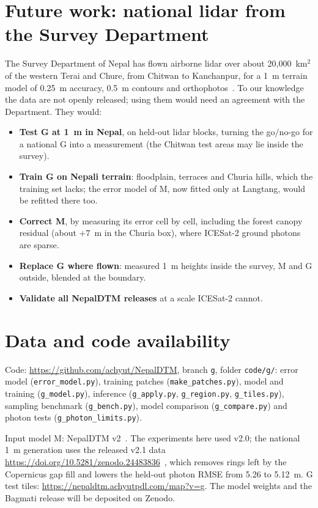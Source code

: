 \documentclass[11pt]{article}
\begin{document}
\section{Future work: national lidar from the Survey Department}
\label{sec:future}
The Survey Department of Nepal has flown airborne lidar over about 20{,}000~km$^2$ of the western Terai and Chure, from
Chitwan to Kanchanpur, for a 1~m terrain model of 0.25~m accuracy, 0.5~m contours and orthophotos~\citep{joshi2020lidar}.
To our knowledge the data are not openly released; using them would need an agreement with the Department. They would:
\begin{itemize}\setlength\itemsep{1pt}
\item \textbf{Test G at 1~m in Nepal}, on held-out lidar blocks, turning the go/no-go for a national G into a measurement
(the Chitwan test areas may lie inside the survey).
\item \textbf{Train G on Nepali terrain}: floodplain, terraces and Churia hills, which the training set lacks; the error
model of M, now fitted only at Langtang, would be refitted there too.
\item \textbf{Correct M}, by measuring its error cell by cell, including the forest canopy residual (about $+7$~m in the
Churia box), where ICESat-2 ground photons are sparse.
\item \textbf{Replace G where flown}: measured 1~m heights inside the survey, M and G outside, blended at the boundary.
\item \textbf{Validate all NepalDTM releases} at a scale ICESat-2 cannot.
\end{itemize}

\section{Data and code availability}
\begin{sloppypar}
Code: \url{https://github.com/achyut/NepalDTM}, branch \texttt{g}, folder \texttt{code/g/}: error model
(\texttt{error\_model.py}), training patches (\texttt{make\_patches.py}), model and training (\texttt{g\_model.py}),
inference (\texttt{g\_apply.py}, \texttt{g\_region.py}, \texttt{g\_tiles.py}), sampling benchmark (\texttt{g\_bench.py}),
model comparison (\texttt{g\_compare.py}) and photon tests (\texttt{g\_photon\_limits.py}).
\end{sloppypar} Input model M: NepalDTM v2~\citep{paudel2026nepaldtmv2}. The experiments here used v2.0; the national 1~m generation uses the released v2.1 data
\url{https://doi.org/10.5281/zenodo.24483836}~\citep{paudel2026nepaldtmv21data}, which removes rings left by the
Copernicus gap fill and lowers the held-out photon RMSE from 5.26 to 5.12~m. G test tiles:
\url{https://nepaldtm.achyutpdl.com/map?v=g}. The model weights and the Bagmati release will be deposited on Zenodo.

\FloatBarrier


\end{document}
